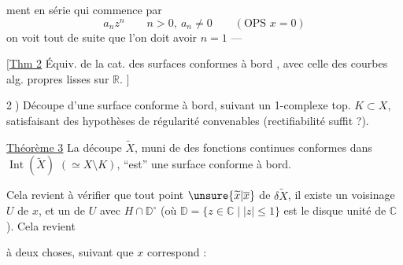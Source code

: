 ment en série qui commence par
\[
a_nz^n\qquad n>0,\ a_n\ne0\qquad(\text{OPS }x=0)
\]
on voit tout de suite que l'on doit avoir
$n=1$ ---


\noindent$\bigl[$\uline{Thm 2} Équiv. de la cat. des surfaces conformes
à bord , avec celle des courbes alg. propres
lisses sur $\mathbb R$. $\bigr]$


\textcircled{2)} Découpe d'une surface conforme à bord,
suivant un 1-complexe top. $K\subset X$,
satisfaisant des hypothèses de régularité
convenables (rectifiabilité suffit ?).

\uline{Théorème 3} La découpe $\widetilde X$, muni de 
 des fonctions  continues conformes
dans $\operatorname{Int}(\widetilde X)$ $(\simeq X\setminus K)$, ``est'' une surface
conforme à bord.


Cela revient à vérifier  que  tout
point $\unsure{\widetilde x|\overline x}$ de $\delta\widetilde X$, il existe un voisinage  $U$ de $x$,
et un  de $U$ avec $H\cap\mathbb D^\circ$ (où
$\mathbb D=\{z\in\mathbb C\mid |z|\leq1\}$ est le disque
unité de $\mathbb C$). Cela revient



à deux choses, suivant que $x$ correspond :
